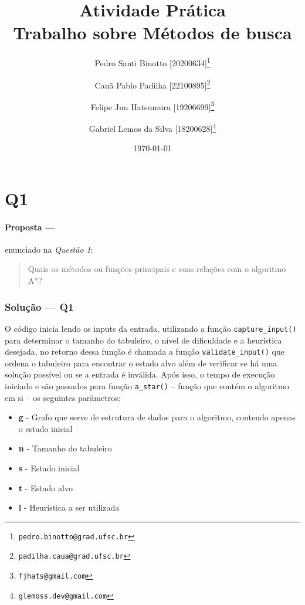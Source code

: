 \documentclass[12pt]{article}
\title{Atividade Prática \RNum{1} \\ [0.2em]\smaller{}Trabalho sobre Métodos de busca}
\author[1]{Pedro Santi Binotto [20200634]\thanks{\texttt{pedro.binotto@grad.ufsc.br}}}
\author[2]{Cauã Pablo Padilha [22100895]\thanks{\texttt{padilha.caua@grad.ufsc.br}}}
\author[3]{Felipe Jun Hatsumura [19206699]\thanks{\texttt{fjhats@gmail.com}}}
\author[4]{Gabriel Lemos da Silva [18200628]\thanks{\texttt{glemoss.dev@gmail.com}}}
\date{\today}
\affil[1]{Departamento de Informática e Estatística, Universidade Federal de Santa Catarina}
\begin{document}
\begin{titlepage}
\maketitle
\thispagestyle{empty}

\end{titlepage}

\tableofcontents

\printglossary[title=Glossário, toctitle=Glossário]

\section{Q1}

\paragraph{Proposta ---} enunciado na \textit{Questão 1}:

\begin{quote}
Quais os métodos ou funções principais e suas relações com o algoritmo A*?
\end{quote}

\subsubsection{Solução --- \textbf{Q1}}

O código inicia lendo os inputs da entrada, utilizando a função \texttt{capture\_input()} para determinar o tamanho do tabuleiro, o nível de dificuldade e a heurística desejada, no retorno dessa função é chamada a função \texttt{validate\_input()} que ordena o tabuleiro para encontrar o estado alvo além de verificar se há uma solução possível ou se a entrada é inválida. Após isso, o tempo de execução iniciado e são passados para função \texttt{a\_star()} -- função que contém o algoritmo em si -- os seguintes parâmetros:

\begin{itemize}
  \item \textbf{g} - Grafo que serve de estrutura de dados para o algoritmo, contendo apenas o estado inicial
  \item \textbf{n} - Tamanho do tabuleiro
  \item \textbf{s} - Estado inicial
  \item \textbf{t} - Estado alvo
  \item \textbf{l} - Heurística a ser utilizada
\end{itemize}
\end{document}
